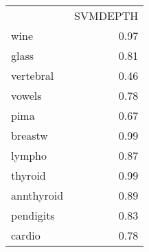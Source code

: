 \begin{tabular}{lr}
 & SVMDEPTH \\
wine & 0.97 \\
glass & 0.81 \\
vertebral & 0.46 \\
vowels & 0.78 \\
pima & 0.67 \\
breastw & 0.99 \\
lympho & 0.87 \\
thyroid & 0.99 \\
annthyroid & 0.89 \\
pendigits & 0.83 \\
cardio & 0.78 \\
\end{tabular}
